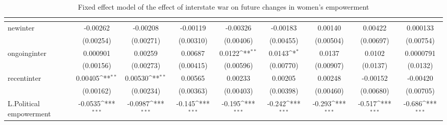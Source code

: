 \begin{table}[htbp]\centering
\def\sym#1{\ifmmode^{#1}\else\(^{#1}\)\fi}
\caption{Fixed effect model of the effect of interstate war on future changes in women's empowerment\label{interwarpolempower}}
\begin{tabular}{l*{8}{c}}
\hline\hline
                    &&&&&&&&\\
\hline
newinter            &    -0.00262         &    -0.00208         &    -0.00119         &    -0.00326         &    -0.00183         &     0.00140         &     0.00422         &    0.000133         \\
                    &   (0.00254)         &   (0.00271)         &   (0.00310)         &   (0.00406)         &   (0.00455)         &   (0.00504)         &   (0.00697)         &   (0.00754)         \\
[1em]
ongoinginter        &    0.000901         &     0.00259         &     0.00687         &      0.0122\sym{**} &      0.0143\sym{*}  &      0.0137         &      0.0102         &   0.0000791         \\
                    &   (0.00156)         &   (0.00273)         &   (0.00415)         &   (0.00596)         &   (0.00770)         &   (0.00907)         &    (0.0137)         &    (0.0132)         \\
[1em]
recentinter         &     0.00405\sym{**} &     0.00530\sym{**} &     0.00565         &     0.00233         &     0.00205         &     0.00248         &    -0.00152         &    -0.00420         \\
                    &   (0.00162)         &   (0.00234)         &   (0.00363)         &   (0.00403)         &   (0.00398)         &   (0.00460)         &   (0.00680)         &   (0.00705)         \\
[1em]
L.Political empowerment&     -0.0535\sym{***}&     -0.0987\sym{***}&      -0.145\sym{***}&      -0.195\sym{***}&      -0.242\sym{***}&      -0.293\sym{***}&      -0.517\sym{***}&      -0.686\sym{***}\\

\end{tabular}
\end{table}
